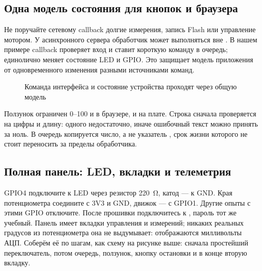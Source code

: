 \subsection{Одна модель состояния для кнопок и браузера}

Не поручайте сетевому callback долгие измерения, запись Flash или управление мотором.
У асинхронного сервера обработчик может выполняться вне .
В нашем примере callback проверяет вход и ставит короткую команду в очередь;
 единолично меняет состояние LED и GPIO. Это защищает модель приложения
от одновременного изменения разными источниками команд.

\begin{figure}[H]\centering
{}
\caption{Команда интерфейса и состояние устройства проходят через общую модель}
\end{figure}

Ползунок ограничен 0--100 и в браузере, и на плате. Строка сначала проверяется на цифры и длину:
одного  недостаточно, иначе ошибочный текст можно принять за ноль.
В очередь копируется число, а не указатель , срок жизни которого не стоит
переносить за пределы обработчика.

\subsection{Полная панель: LED, вкладки и телеметрия}

GPIO4 подключите к LED через резистор \SI{220}{\ohm}, катод --- к GND.
Края потенциометра соедините с 3V3 и GND, движок --- с GPIO1. Другие опыты с этими GPIO отключите.
После прошивки подключитесь к , пароль тот же учебный.
Панель имеет вкладки управления и измерений; никаких реальных градусов из потенциометра
она не выдумывает: отображаются милливольты АЦП. Соберём её по шагам, как схему на рисунке выше:
сначала простейший переключатель, потом очередь, ползунок, кнопку остановки и в конце вторую вкладку.

